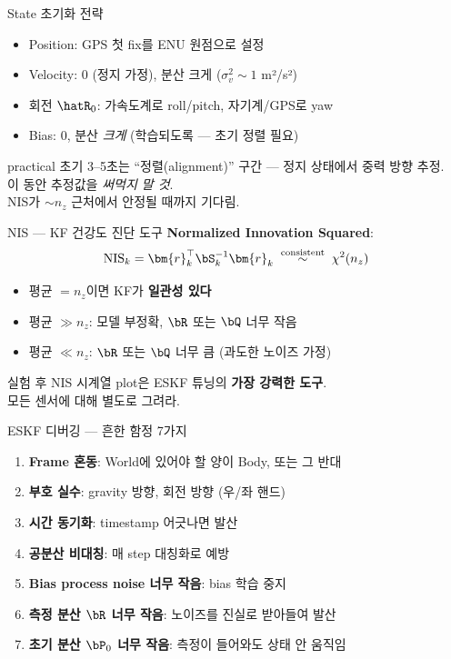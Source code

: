 \begin{frame}{State 초기화 전략}
  \begin{itemize}
    \item Position: GPS 첫 fix를 ENU 원점으로 설정
    \item Velocity: 0 (정지 가정), 분산 크게 ($\sigma_v^2 \sim 1$ m²/s²)
    \item 회전 $\hatR_0$: 가속도계로 roll/pitch, 자기계/GPS로 yaw
    \item Bias: 0, 분산 \emph{크게} (학습되도록 — 초기 정렬 필요)
  \end{itemize}
  \pause
  \vspace{0.3em}
  \begin{block}{practical}
    초기 3--5초는 ``정렬(alignment)'' 구간 — 정지 상태에서 중력 방향 추정.\\
    이 동안 추정값을 \emph{써먹지 말 것}. \\
    NIS가 $\sim n_z$ 근처에서 안정될 때까지 기다림.
  \end{block}
\end{frame}

\begin{frame}{NIS — KF 건강도 진단 도구}
  \textbf{Normalized Innovation Squared}:
  \[
    \text{NIS}_k = \bm{r}_k^\top \bS_k^{-1} \bm{r}_k \;\overset{\text{consistent}}{\sim}\; \chi^2(n_z)
  \]
  \begin{itemize}
    \item 평균 $= n_z$이면 KF가 \textbf{일관성 있다}
    \item 평균 $\gg n_z$: 모델 부정확, $\bR$ 또는 $\bQ$ 너무 작음
    \item 평균 $\ll n_z$: $\bR$ 또는 $\bQ$ 너무 큼 (과도한 노이즈 가정)
  \end{itemize}
  \pause
  \vspace{0.3em}
  실험 후 NIS 시계열 plot은 ESKF 튜닝의 \textbf{가장 강력한 도구}.\\
  모든 센서에 대해 별도로 그려라.
\end{frame}

\begin{frame}{ESKF 디버깅 — 흔한 함정 7가지}
  \begin{enumerate}
    \item \textbf{Frame 혼동}: World에 있어야 할 양이 Body, 또는 그 반대
    \item \textbf{부호 실수}: gravity 방향, 회전 방향 (우/좌 핸드)
    \item \textbf{시간 동기화}: timestamp 어긋나면 발산
    \item \textbf{공분산 비대칭}: 매 step 대칭화로 예방
    \item \textbf{Bias process noise 너무 작음}: bias 학습 중지
    \item \textbf{측정 분산 $\bR$ 너무 작음}: 노이즈를 진실로 받아들여 발산
    \item \textbf{초기 분산 $\bP_0$ 너무 작음}: 측정이 들어와도 상태 안 움직임
  \end{enumerate}
\end{frame}

